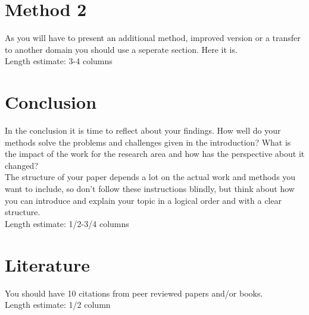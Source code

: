 \documentclass[sigconf,natbib=false]{acmart}
\begin{document}
\section{Method 2}
As you will have to present an additional method, improved version or a transfer to another domain you should use a seperate section. Here it is. \\
Length estimate: 3-4 columns

\section{Conclusion}
In the conclusion it is time to reflect about your findings. How well do your methods solve the problems and challenges given in the introduction? What is the impact of the work for the research area and how has the perspective about it changed?\\
	The structure of your paper depends a lot on the actual work and
methods you want to include, so don't follow these instructions blindly, but think about how you can introduce and explain your topic in a logical order and with a clear structure. \\
Length estimate: 1/2-3/4 columns

\section{Literature}
You should have 10 citations from peer reviewed papers and/or books. \\
Length estimate: 1/2 column
\end{document}
